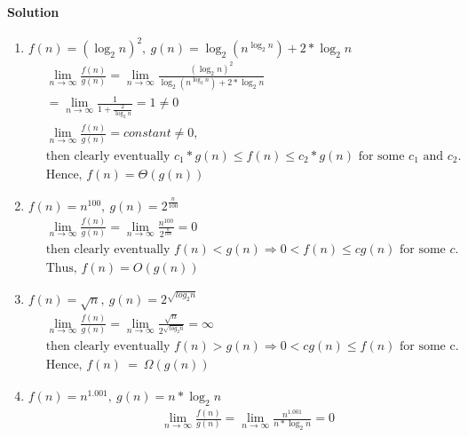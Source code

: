 \documentclass[a4paper]{scrartcl}
\begin{document}
\paragraph{Solution}
\begin{enumerate}[label=(\alph*)]
  \item $f(n)=\left(\log_2n\right)^2,\ g(n)=\log_2\left(n^{\log_2{n}}\right) + 2*\log_2{n}$
  \begin{align*}
  &\ \lim_{n\to\infty} \frac{f(n)}{g(n)}= \lim_{n\to\infty} \frac{\left(\log_2n\right)^2}{\log_2\left(n^{\log_2{n}}\right) + 2*\log_2{n}}\\
  &\ =\lim_{n\to\infty} \frac{1}{1+\frac{2}{\log_2{n}}}=1\neq0\\
  &\ \lim_{n\to\infty}\frac{f(n)}{g(n)}=constant\neq0,\\ &\
  \text{then clearly eventually }c_1*g(n)\leq f(n) \leq c_2*g(n)\text{ for some }c_1\text{ and }c_2.\\ &\
  \text{Hence, }f(n)=\Theta(g(n))
  \end{align*}
  \item $f(n)= n^{100},\ g(n)=2^{\frac{n}{100}}$
  \begin{align*}
   &\ \lim_{n\to\infty} \frac{f(n)}{g(n)}=\lim_{n\to\infty} \frac{n^{100}}{2^{\frac{n}{100}}}=0\\ &\
  \text{then clearly eventually }f(n)<g(n) \Rightarrow 0<f(n)\leq cg(n)\text{ for some }c.\\ &\
  \text{Thus, }f(n)=O(g(n))
  \end{align*}
  \item $f(n)=\sqrt{n},\ g(n)=2^{\sqrt{log_2 n}}$
  \begin{align*}
    &\ \lim_{n\to\infty} \frac{f(n)}{g(n)}=\lim_{n\to\infty} \frac{\sqrt{n}}{2^{\sqrt{log_2 n}}}=\infty\\ &\
    \text{then clearly eventually }f(n)>g(n) \Rightarrow 0<cg(n)\leq f(n)\text{ for some c}.\\ &\
     \text{Hence, }f(n)\ =\ \Omega(g(n))
  \end{align*}
  \item $f(n)=n^{1.001},\ g(n)=n*\log_2{n}$
  \begin{align*}
    &\ \lim_{n\to\infty} \frac{f(n)}{g(n)}=\lim_{n\to\infty} \frac{n^{1.001}}{n*\log_2{n}}=0\\ &\

\end{align*}
\end{enumerate}
\end{document}
